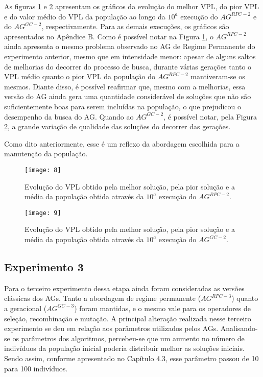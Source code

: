 As figuras \ref{fig:graph2_1} e \ref{fig:graph2_2} apresentam os gráficos da evolução do melhor VPL, do pior VPL e do valor médio do VPL da população ao longo da $10^a$ execução do $AG^{RPC-2}$ e do $AG^{GC-2}$, respectivamente. Para as demais execuções, os gráficos são apresentados no Apêndice B.  Como é possível notar na Figura \ref{fig:graph2_1}, o $AG^{RPC-2}$ ainda apresenta o mesmo problema observado no AG de Regime Permanente do experimento anterior, mesmo que em intensidade menor: apesar de alguns saltos de melhorias do decorrer do processo de busca, durante várias gerações tanto o VPL médio quanto o pior VPL da população do $AG^{RPC-2}$ mantiveram-se os mesmos. Diante disso, é possível reafirmar que, mesmo com a melhorias, essa versão do AG ainda gera uma quantidade considerável de soluções que não são suficientemente boas para serem incluídas na população, o que prejudicou o desempenho da busca do AG. Quando ao $AG^{GC-2}$, é possível notar, pela Figura \ref{fig:graph2_2}, a grande variação de qualidade das soluções do decorrer das gerações. 

Como dito anteriormente, esse é um reflexo da abordagem escolhida para a manutenção da população.

\begin{figure}[H]
\centering
\texttt{[image: 8]}
\caption{Evolução do VPL obtido pela melhor solução, pela pior solução e a média da população obtida através da $10^a$ execução do $AG^{RPC-2}$.}
\label{fig:graph2_1}
\end{figure}

\begin{figure}[H]
\centering
\texttt{[image: 9]}
\caption{Evolução do VPL obtido pela melhor solução, pela pior solução e a média da população obtida através da $10^a$ execução do $AG^{GC-2}$.}
\label{fig:graph2_2}
\end{figure}

\subsection{Experimento 3}
\label{ch:5_Experimento3}
Para o terceiro experimento dessa etapa ainda foram consideradas as versões clássicas dos AGs. Tanto a abordagem de regime permanente ($AG^{RPC-3}$) quanto a geracional ($AG^{GC-3}$) foram mantidas, e o mesmo vale para os operadores de seleção, recombinação e mutação. A principal alteração realizada nesse terceiro experimento se deu em relação aos parâmetros utilizados pelos AGs. Analisando-se os parâmetros dos algoritmos, percebeu-se que um aumento no número de indivíduos da população inicial poderia distribuir melhor as soluções iniciais. Sendo assim, conforme apresentado no Capítulo 4.3, esse parâmetro passou de 10 para 100 indivíduos.

